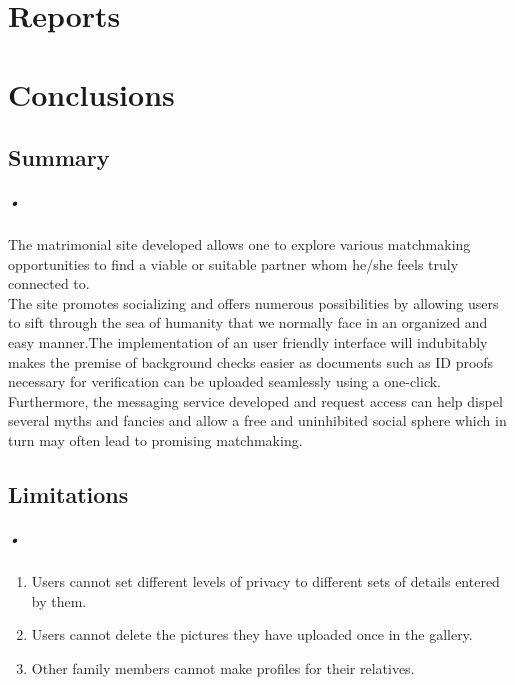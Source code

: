 \documentclass[12pt]{report}
\begin{document}
\chapter{Reports} 

\chapter{Conclusions}
\section{Summary}
\paragraph*{•}
 
 The matrimonial site developed allows one to explore various matchmaking opportunities to find a viable or suitable partner whom he/she feels truly connected to.\\

The site promotes socializing and offers numerous possibilities by allowing users to sift through the sea of humanity that we normally face in an organized and easy manner.The implementation of an user friendly interface will indubitably makes the premise of background checks easier as documents such as ID proofs necessary for verification can be uploaded seamlessly using a one-click.\\


Furthermore, the messaging service developed and request access can help dispel several myths and fancies and allow a free and uninhibited social sphere which in turn may often lead to promising matchmaking.


\section{Limitations}
\paragraph*{•}
 
\begin{enumerate}
\item Users cannot set different levels of privacy to different sets of details entered by them. 
\item Users cannot delete the pictures they have uploaded once in the gallery. 
\item Other family members cannot make profiles for their relatives.
\end{enumerate}
\end{document}
